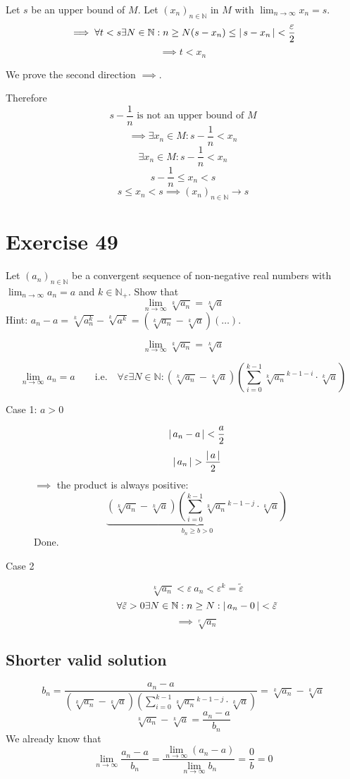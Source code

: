 \documentclass[a4paper]{article}
\theoremstyle{definition}
\newcommand\abs[1]{\left|\thinspace #1\thinspace\right|}
\begin{document}
Let $s$ be an upper bound of $M$.
Let $(x_n)_{n \in \mathbb N}$ in $M$ with $\lim_{n\to\infty} x_n = s$.
\[ \implies \forall t < s \exists N \in \mathbb N: n \geq N(s - x_n) \leq \abs{s-x_n} < \frac{\varepsilon}{2} \]
\[ \implies t < x_n \]

We prove the second direction $\implies$.

Therefore
\[ s - \frac1n \text{ is not an upper bound of } M \]
\[ \implies \exists x_n \in M: s - \frac1n < x_n \]
\[ \exists x_n \in M: s - \frac1n < x_n \]
\[ s - \frac1n \leq x_n < s \]
\[ s \leq x_n < s \implies (x_n)_{n\in\mathbb N} \to s \]


\section{Exercise 49}
\begin{ex}
  Let $(a_n)_{n\in\mathbb N}$ be a convergent sequence of non-negative real numbers
  with $\lim_{n\to\infty} a_n = a$ and $k \in \mathbb N_+$. Show that
  \[ \lim_{n\to\infty} \sqrt[k]{a_n} = \sqrt[k]{a} \]
  Hint: $a_n - a = \sqrt[k]{a_n^k} - \sqrt[k]{a^k} = (\sqrt[k]{a_n} - \sqrt[k]{a}) (\dots)$.
\end{ex}

\[ \lim_{n\to\infty} \sqrt[k]{a_n} = \sqrt[k]{a} \]

\[
    \lim_{n\to\infty} a_n = a \qquad \text{i.e.} \quad \forall \varepsilon \exists N \in \mathbb N:
    \left(\sqrt[k]{a_n} - \sqrt[k]{a}\right) \left(\sum_{i=0}^{k-1} \sqrt[k]{a_n}^{k-1-i} \cdot \sqrt[k]{a}\right)
\]

\begin{description}
  \item[Case 1: $a > 0$]
    \[ \abs{a_n - a} < \frac{a}{2} \]
    \[ \abs{a_n} > \frac{\abs{a}}{2} \]
    $\implies$ the product is always positive:
    \[ \underbrace{\left(\sqrt[k]{a_n} - \sqrt[k]{a}\right) \left(\sum_{i=0}^{k-1} \sqrt[k]{a_n}^{k-1-j} \cdot \sqrt[k]{a}\right)}_{b_n \geq b > 0} \]
    Done.
  \item[Case 2]
    \[ \sqrt[k]{a_n} < \varepsilon \ a_n < \varepsilon^k = \tilde\varepsilon \]
    \[ \forall \tilde\varepsilon > 0 \exists N \in \mathbb N: n \geq N: \abs{a_n - 0} < \tilde\varepsilon \]
    \[ \implies \sqrt[r]{a_n} \]
\end{description}

\subsection{Shorter valid solution}
\[
  b_n
  = \frac{a_n - a}{\left(\sqrt[k]{a_n} - \sqrt[k]{a}\right) \left(\sum_{i=0}^{k-1} \sqrt[k]{a_n}^{k-1-j} \cdot \sqrt[k]{a}\right)}
  = \sqrt[k]{a_n} - \sqrt[k]{a}
\]
\[
  \sqrt[k]{a_n} - \sqrt[k]{a} = \frac{a_n - a}{b_n}
\]
We already know that
\[ \lim_{n\to\infty} \frac{a_n - a}{b_n} = \frac{\lim_{n\to\infty} (a_n - a)}{\lim_{n\to\infty} b_n} = \frac0b = 0 \]
\end{document}
